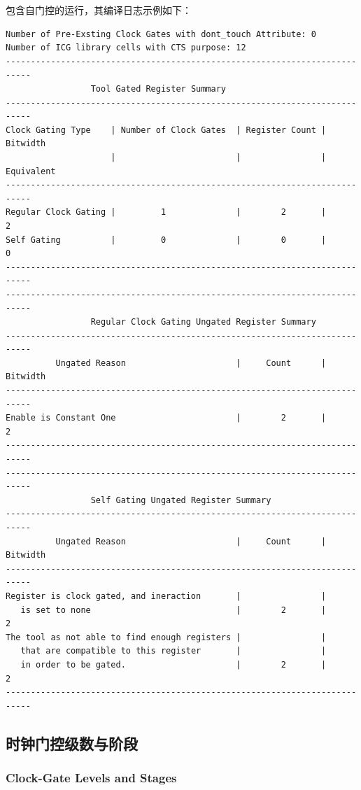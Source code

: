 包含自门控的运行，其编译日志示例如下：
\begin{lstlisting}[caption={含自门控的编译日志示例}]
Number of Pre-Exsting Clock Gates with dont_touch Attribute: 0
Number of ICG library cells with CTS purpose: 12
---------------------------------------------------------------------------
                 Tool Gated Register Summary
---------------------------------------------------------------------------
Clock Gating Type    | Number of Clock Gates  | Register Count | Bitwidth
                     |                        |                | Equivalent
---------------------------------------------------------------------------
Regular Clock Gating |         1              |        2       |        2
Self Gating          |         0              |        0       |        0
---------------------------------------------------------------------------
---------------------------------------------------------------------------
                 Regular Clock Gating Ungated Register Summary
---------------------------------------------------------------------------
          Ungated Reason                      |     Count      | Bitwidth
---------------------------------------------------------------------------
Enable is Constant One                        |        2       |       2
---------------------------------------------------------------------------
---------------------------------------------------------------------------
                 Self Gating Ungated Register Summary
---------------------------------------------------------------------------
          Ungated Reason                      |     Count      | Bitwidth
---------------------------------------------------------------------------
Register is clock gated, and ineraction       |                |
   is set to none                             |        2       |       2
The tool as not able to find enough registers |                |
   that are compatible to this register       |                |
   in order to be gated.                      |        2       |       2
---------------------------------------------------------------------------
\end{lstlisting}

\subsection{时钟门控级数与阶段}
\subsubsection*{Clock-Gate Levels and Stages}

